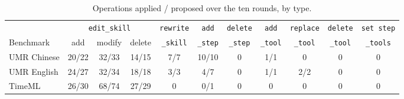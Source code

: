 \begin{table}[t]
\centering\small
\setlength{\tabcolsep}{4pt}
\begin{tabular}{@{}lcccccccccc@{}}
\toprule
& \multicolumn{3}{c}{\texttt{edit\_skill}} & \texttt{rewrite} & \texttt{add} & \texttt{delete} & \texttt{add} & \texttt{replace} & \texttt{delete} & \texttt{set step} \\
Benchmark & add & modify & delete & \texttt{\_skill} & \texttt{\_step} & \texttt{\_step} & \texttt{\_tool} & \texttt{\_tool} & \texttt{\_tool} & \texttt{\_tools} \\
\midrule
UMR Chinese & 20/22 & 32/33 & 14/15 & 7/7 & 10/10 & 0 & 1/1 & 0 & 0 & 0 \\
UMR English & 24/27 & 32/34 & 18/18 & 3/3 & 4/7 & 0 & 1/1 & 2/2 & 0 & 0 \\
TimeML & 26/30 & 68/74 & 27/29 & 0 & 0/1 & 0 & 0 & 0 & 0 & 0 \\
\bottomrule
\end{tabular}
\caption{Operations applied / proposed over the ten rounds, by type.}
\label{tab:ops}
\end{table}
